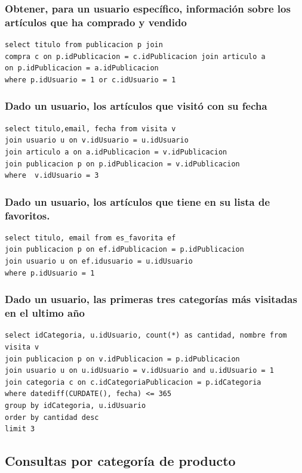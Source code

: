\documentclass[a4paper, 10pt, twoside]{article}
\begin{document}
\subsubsection{Obtener, para un usuario espec\'ifico, informaci\'on sobre los art\'iculos que ha comprado y vendido}
\begin{verbatim}
select titulo from publicacion p join 
compra c on p.idPublicacion = c.idPublicacion join articulo a 
on p.idPublicacion = a.idPublicacion 
where p.idUsuario = 1 or c.idUsuario = 1 
\end{verbatim}


\subsubsection{Dado un usuario, los art\'iculos que visit\'o con su fecha}
\begin{verbatim}
select titulo,email, fecha from visita v 
join usuario u on v.idUsuario = u.idUsuario 
join articulo a on a.idPublicacion = v.idPublicacion 
join publicacion p on p.idPublicacion = v.idPublicacion 
where  v.idUsuario = 3
\end{verbatim}

\subsubsection{Dado un usuario, los art\'iculos que tiene en su lista de favoritos.}
\begin{verbatim}
select titulo, email from es_favorita ef 
join publicacion p on ef.idPublicacion = p.idPublicacion 
join usuario u on ef.idusuario = u.idUsuario  
where p.idUsuario = 1
\end{verbatim}

\subsubsection{Dado un usuario, las primeras tres categor\'ias m\'as visitadas en el ultimo a\~no}
\begin{verbatim}
select idCategoria, u.idUsuario, count(*) as cantidad, nombre from visita v 
join publicacion p on v.idPublicacion = p.idPublicacion 
join usuario u on u.idUsuario = v.idUsuario and u.idUsuario = 1
join categoria c on c.idCategoriaPublicacion = p.idCategoria
where datediff(CURDATE(), fecha) <= 365 
group by idCategoria, u.idUsuario
order by cantidad desc
limit 3
\end{verbatim}
\newpage
\subsection{Consultas por categor\'ia de producto}
\end{document}
